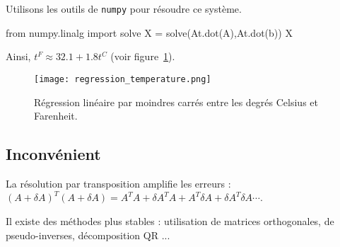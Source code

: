 \begin{exemple}
Utilisons les outils de \texttt{numpy} pour résoudre ce système. 
\begin{pyconsole}
from numpy.linalg import solve
X = solve(At.dot(A),At.dot(b))
X
\end{pyconsole}
Ainsi, $t^F \approx 32.1+1.8 t^C$ (voir figure~\ref{13systeme:fig:regression_temperature}).

\end{exemple}

\begin{figure}[!h]
\begin{center}
  \texttt{[image: regression\_temperature.png]}
  \caption{Régression linéaire par moindres carrés entre les degrés Celsius et Farenheit.}
  \label{13systeme:fig:regression_temperature}
\end{center}
\end{figure}
\subsection{Inconvénient}

La résolution par transposition amplifie les erreurs : $(A+\delta A)^T(A+\delta A)=A^TA+\delta 
A^TA+A^T\delta A+\delta A^T\delta A \cdots$.

Il existe des méthodes plus stables : utilisation de matrices orthogonales, de pseudo-inverses, 
décomposition QR ...

